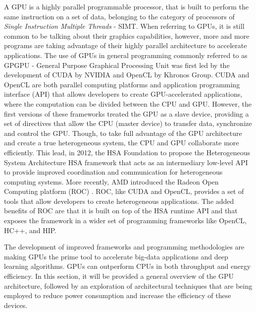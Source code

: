 A GPU is a highly parallel programmable processor, that is built to perform the same instruction on a set of data, belonging to the category of processors of \textit{Single Instruction Multiple Threads} - SIMT. When referring to GPUs, it is still common to be talking about their graphics capabilities, however, more and more programs are taking advantage of their highly parallel architecture to accelerate applications. The use of GPUs in general programming commonly referred to as GPGPU - General Purpose Graphical Processing Unit was first led by the development of CUDA \cite{noauthor_cuda_2017} by NVIDIA and OpenCL \cite{noauthor_opencl_2013} by Khronos Group. CUDA and OpenCL are both parallel computing platforms and application programming interface (API) that allows developers to create GPU-accelerated applications, where the computation can be divided between the CPU and GPU. However, the first versions of these frameworks treated the GPU as a slave device, providing a set of directives that allow the CPU (master device) to transfer data, synchronize and control the GPU.  Though, to take full advantage of the GPU architecture and create a true heterogeneous system, the CPU and GPU collaborate more efficiently. This lead, in 2012, the HSA Foundation to propose the Heterogeneous System Architecture HSA \cite{hwu_heterogeneous_2015} framework that acts as an intermediary low-level API to provide improved coordination and communication for heterogeneous computing systems.  More recently, AMD introduced the Radeon Open Computing platform (ROC) \cite{noauthor_radeonopencompute/rocm_2019}. ROC, like CUDA and OpenCL, provides a set of tools that allow developers to create heterogeneous applications. The added benefits of ROC are that it is built on top of the HSA runtime API and that exposes the framework in a wider set of programming frameworks like OpenCL, HC++, and HIP.

The development of improved frameworks and programming methodologies are making GPUs the prime tool to accelerate big-data applications and deep learning algorithms. GPUs can outperform CPUs in both throughput and energy efficiency. In this section, it will be provided a general overview of the GPU architecture, followed by an exploration of architectural techniques that are being employed to reduce power consumption and increase the efficiency of these devices.


